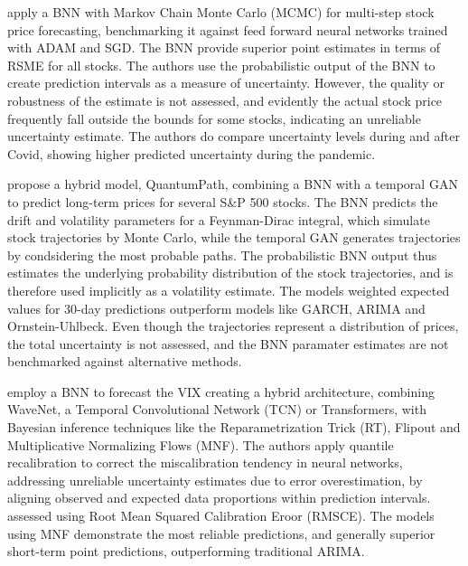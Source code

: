 \textcite{chandra2021bayesian} apply a BNN with Markov Chain Monte Carlo (MCMC) for multi-step stock price forecasting, benchmarking it against feed forward neural networks trained with ADAM and SGD. The BNN provide superior point estimates in terms of RSME for all stocks. The authors use the probabilistic output of the BNN to create prediction intervals as a measure of uncertainty. However, the quality or robustness of the estimate is not assessed, and evidently the actual stock price frequently fall outside the bounds for some stocks, indicating an unreliable uncertainty estimate. The authors do compare uncertainty levels during and after Covid, showing higher predicted uncertainty during the pandemic.

\textcite{soleymani2022longterm} propose a hybrid model, QuantumPath, combining a BNN with a temporal GAN to predict long-term prices for several S\&P 500 stocks. The BNN predicts the drift and volatility parameters for a Feynman-Dirac integral, which simulate stock trajectories by Monte Carlo, while the temporal GAN generates trajectories by condsidering the most probable paths. The probabilistic BNN output thus estimates the underlying probability distribution of the stock trajectories, and is therefore used implicitly as a volatility estimate. The models weighted expected values for 30-day predictions outperform models like GARCH, ARIMA and Ornstein-Uhlbeck. Even though the trajectories represent a distribution of prices, the total uncertainty is not assessed, and the BNN paramater estimates are not benchmarked against alternative methods.

\textcite{hortua2024forecasting} employ a BNN to forecast the VIX creating a hybrid architecture, combining WaveNet, a Temporal Convolutional Network (TCN) or  Transformers, with Bayesian inference techniques like the Reparametrization Trick (RT), Flipout and Multiplicative Normalizing Flows (MNF). The authors apply quantile recalibration to correct the miscalibration tendency in neural networks, addressing unreliable uncertainty estimates due to error overestimation, by aligning observed and expected data proportions within prediction intervals. assessed using Root Mean Squared Calibration Eroor (RMSCE). The models using MNF demonstrate the most reliable predictions, and generally superior short-term point predictions, outperforming traditional ARIMA. 

